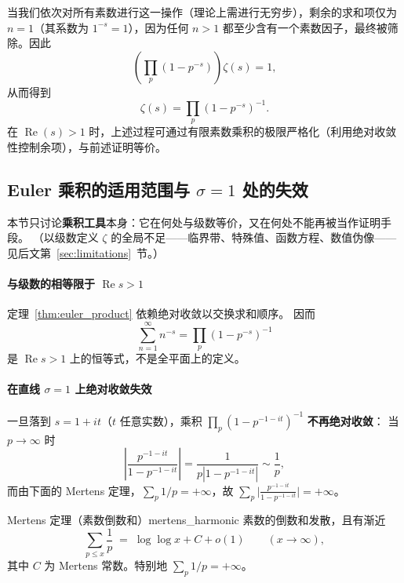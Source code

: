 当我们依次对所有素数进行这一操作（理论上需进行无穷步），剩余的求和项仅为 $n=1$（其系数为 $1^{-s} = 1$），因为任何 $n > 1$ 都至少含有一个素数因子，最终被筛除。因此
\[
\left(\prod_p (1 - p^{-s}) \right) \zeta(s) = 1,
\]
从而得到
\[
\zeta(s) =\prod_p (1 - p^{-s})^{-1}.
\]
在 $\operatorname{Re}(s) > 1$ 时，上述过程可通过有限素数乘积的极限严格化（利用绝对收敛性控制余项），与前述证明等价。

\subsection{Euler 乘积的适用范围与 \texorpdfstring{$\sigma=1$}{sigma=1} 处的失效}
\label{sec:euler-fail}
\label{sec:euler-limitations}

本节只讨论\textbf{乘积工具}本身：它在何处与级数等价，又在何处不能再被当作证明手段。
（以级数定义 $\zeta$ 的全局不足——临界带、特殊值、函数方程、数值伪像——见后文第~\ref{sec:limitations}~节。）

\paragraph{与级数的相等限于 $\operatorname{Re}s>1$}
定理~\ref{thm:euler_product} 依赖绝对收敛以交换求和顺序。
因而
\[
  \sum_{n=1}^{\infty}n^{-s}
  =\prod_{p}(1-p^{-s})^{-1}
\]
是 $\operatorname{Re}s>1$ 上的恒等式，不是全平面上的定义。

\paragraph{在直线 $\sigma=1$ 上绝对收敛失效}
一旦落到 $s=1+it$（$t$ 任意实数），乘积
$\prod_p (1-p^{-1-it})^{-1}$ \textbf{不再绝对收敛}：
当 $p\to\infty$ 时
\begin{equation}
\left|\frac{p^{-1-it}}{1-p^{-1-it}}\right| = \frac{1}{p|1-p^{-1-it}|} \sim \frac{1}{p},
\end{equation}
而由下面的 Mertens 定理，$\sum_p 1/p=+\infty$，故
$\sum_p \bigl|\frac{p^{-1-it}}{1-p^{-1-it}}\bigr|=+\infty$。

\begin{theorem}{Mertens 定理（素数倒数和）}{mertens_harmonic}
素数的倒数和发散，且有渐近
\begin{equation}
  \sum_{p\le x}\frac{1}{p}
  \;=\;
  \log\log x + C + o(1)
  \qquad(x\to\infty),
  \label{eq:mertens_sum_1_p}
\end{equation}
其中 $C$ 为 Mertens 常数。特别地 $\sum_p 1/p=+\infty$。
\end{theorem}

